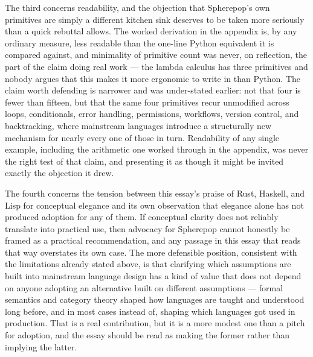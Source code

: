 \documentclass[11pt]{article}
\begin{document}
The third concerns readability, and the objection that Spherepop's own primitives are simply a different kitchen sink deserves to be taken more seriously than a quick rebuttal allows. The worked derivation in the appendix is, by any ordinary measure, less readable than the one-line Python equivalent it is compared against, and minimality of primitive count was never, on reflection, the part of the claim doing real work --- the lambda calculus has three primitives and nobody argues that this makes it more ergonomic to write in than Python. The claim worth defending is narrower and was under-stated earlier: not that four is fewer than fifteen, but that the same four primitives recur unmodified across loops, conditionals, error handling, permissions, workflows, version control, and backtracking, where mainstream languages introduce a structurally new mechanism for nearly every one of those in turn. Readability of any single example, including the arithmetic one worked through in the appendix, was never the right test of that claim, and presenting it as though it might be invited exactly the objection it drew.

The fourth concerns the tension between this essay's praise of Rust, Haskell, and Lisp for conceptual elegance and its own observation that elegance alone has not produced adoption for any of them. If conceptual clarity does not reliably translate into practical use, then advocacy for Spherepop cannot honestly be framed as a practical recommendation, and any passage in this essay that reads that way overstates its own case. The more defensible position, consistent with the limitations already stated above, is that clarifying which assumptions are built into mainstream language design has a kind of value that does not depend on anyone adopting an alternative built on different assumptions --- formal semantics and category theory shaped how languages are taught and understood long before, and in most cases instead of, shaping which languages got used in production. That is a real contribution, but it is a more modest one than a pitch for adoption, and the essay should be read as making the former rather than implying the latter.
\end{document}
